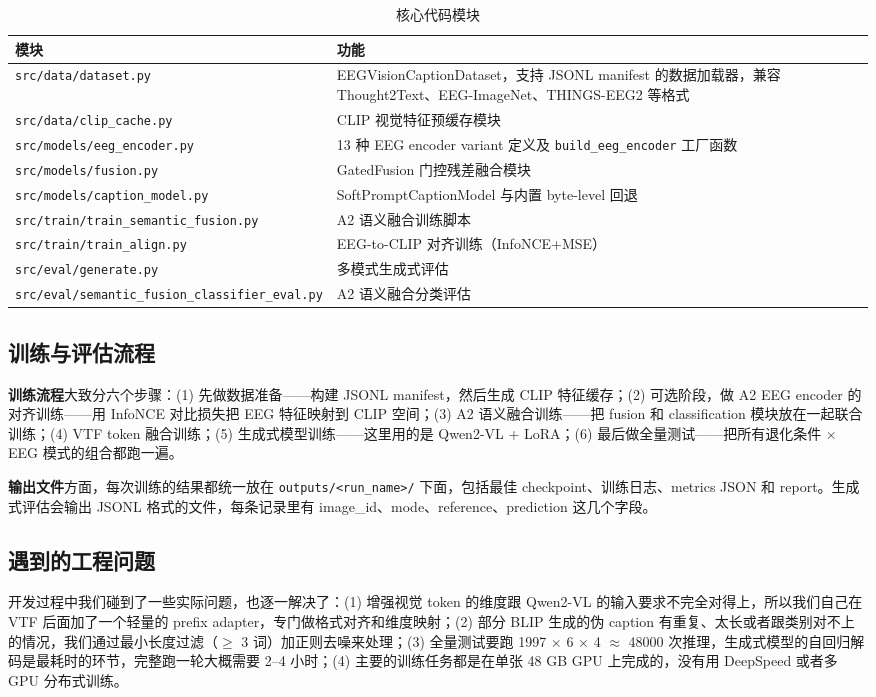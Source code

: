 \begin{table}[htbp]
  \centering
  \caption{核心代码模块}
  \label{tab:code-modules}
  \begin{tabularx}{\linewidth}{l X}
    \toprule
    模块 & 功能 \\
    \midrule
    \texttt{src/data/dataset.py} & EEGVisionCaptionDataset，支持 JSONL manifest 的数据加载器，兼容 Thought2Text、EEG-ImageNet、THINGS-EEG2 等格式 \\
    \texttt{src/data/clip\_cache.py} & CLIP 视觉特征预缓存模块 \\
    \texttt{src/models/eeg\_encoder.py} & 13 种 EEG encoder variant 定义及 \texttt{build\_eeg\_encoder} 工厂函数 \\
    \texttt{src/models/fusion.py} & GatedFusion 门控残差融合模块 \\
    \texttt{src/models/caption\_model.py} & SoftPromptCaptionModel 与内置 byte-level 回退 \\
    \texttt{src/train/train\_semantic\_fusion.py} & A2 语义融合训练脚本 \\
    \texttt{src/train/train\_align.py} & EEG-to-CLIP 对齐训练（InfoNCE+MSE）\\
    \texttt{src/eval/generate.py} & 多模式生成式评估 \\
    \texttt{src/eval/semantic\_fusion\_classifier\_eval.py} & A2 语义融合分类评估 \\
    \bottomrule
  \end{tabularx}
\end{table}

\subsection{训练与评估流程}

\textbf{训练流程}大致分六个步骤：(1) 先做数据准备——构建 JSONL manifest，然后生成 CLIP 特征缓存；(2) 可选阶段，做 A2 EEG encoder 的对齐训练——用 InfoNCE 对比损失把 EEG 特征映射到 CLIP 空间；(3) A2 语义融合训练——把 fusion 和 classification 模块放在一起联合训练；(4) VTF token 融合训练；(5) 生成式模型训练——这里用的是 Qwen2-VL + LoRA；(6) 最后做全量测试——把所有退化条件 $\times$ EEG 模式的组合都跑一遍。

\textbf{输出文件}方面，每次训练的结果都统一放在 \texttt{outputs/<run\_name>/} 下面，包括最佳 checkpoint、训练日志、metrics JSON 和 report。生成式评估会输出 JSONL 格式的文件，每条记录里有 image\_id、mode、reference、prediction 这几个字段。

\subsection{遇到的工程问题}

开发过程中我们碰到了一些实际问题，也逐一解决了：(1) 增强视觉 token 的维度跟 Qwen2-VL 的输入要求不完全对得上，所以我们自己在 VTF 后面加了一个轻量的 prefix adapter，专门做格式对齐和维度映射；(2) 部分 BLIP 生成的伪 caption 有重复、太长或者跟类别对不上的情况，我们通过最小长度过滤（$\geq$ 3 词）加正则去噪来处理；(3) 全量测试要跑 1997 $\times$ 6 $\times$ 4 $\approx$ 48000 次推理，生成式模型的自回归解码是最耗时的环节，完整跑一轮大概需要 2--4 小时；(4) 主要的训练任务都是在单张 48 GB GPU 上完成的，没有用 DeepSpeed 或者多 GPU 分布式训练。
